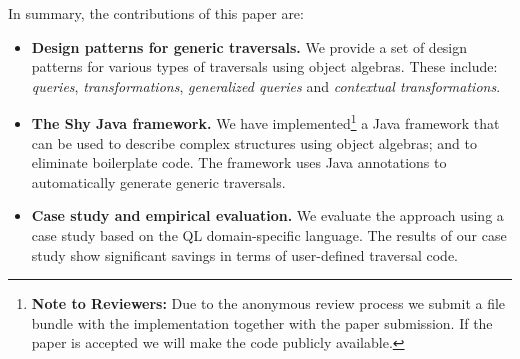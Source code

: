 In summary, the contributions of this paper are:

\begin{itemize}

\item {\bf Design patterns for generic traversals.} We provide a set of design
patterns for various types of traversals using object algebras. These include:
\emph{queries}, \emph{transformations},
\emph{generalized queries} and \emph{contextual transformations}.

\item {\bf The Shy Java framework.} We have implemented\footnote{{\bf
      Note to Reviewers:} Due to the anonymous review process we
    submit a file bundle with the implementation together with the paper submission. If the
    paper is accepted we will make the code publicly available.} a
  Java framework that can be used to describe complex structures using
  object algebras; and to eliminate boilerplate code. The framework
  uses Java annotations to automatically generate generic traversals.


\item {\bf Case study and empirical evaluation.} We evaluate the
  approach using a case study based on the QL domain-specific
  language. The results of our case study show significant savings in
  terms of user-defined traversal code.
\end{itemize}
